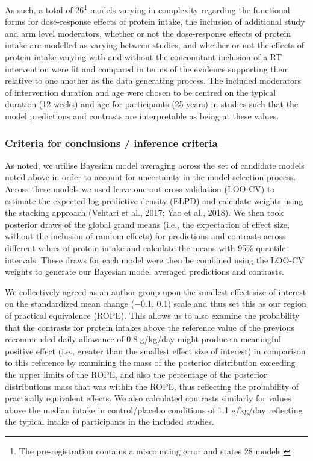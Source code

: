 \documentclass[
]{article}
\begin{document}
As such, a total of 26\footnote{The pre-registration contains a
  miscounting error and states 28 models.} models varying in complexity
regarding the functional forms for dose-response effects of protein
intake, the inclusion of additional study and arm level moderators,
whether or not the dose-response effects of protein intake are modelled
as varying between studies, and whether or not the effects of protein
intake varying with and without the concomitant inclusion of a RT
intervention were fit and compared in terms of the evidence supporting
them relative to one another as the data generating process. The
included moderators of intervention duration and age were chosen to be
centred on the typical duration (12 weeks) and age for participants (25
years) in studies such that the model predictions and contrasts are
interpretable as being at these values.

\subsubsection{Criteria for conclusions / inference
criteria}\label{criteria-for-conclusions-inference-criteria}

As noted, we utilise Bayesian model averaging across the set of
candidate models noted above in order to account for uncertainty in the
model selection process. Across these models we used leave-one-out
cross-validation (LOO-CV) to estimate the expected log predictive
density (ELPD) and calculate weights using the stacking approach
(Vehtari et al., 2017; Yao et al., 2018). We then took posterior draws
of the global grand means (i.e., the expectation of effect size, without
the inclusion of random effects) for predictions and contrasts across
different values of protein intake and calculate the means with 95\%
quantile intervals. These draws for each model were then be combined
using the LOO-CV weights to generate our Bayesian model averaged
predictions and contrasts.

We collectively agreed as an author group upon the smallest effect size
of interest on the standardized mean change (−0.1, 0.1) scale and thus
set this as our region of practical equivalence (ROPE). This allows us
to also examine the probability that the contrasts for protein intakes
above the reference value of the previous recommended daily allowance of
0.8 g/kg/day might produce a meaningful positive effect (i.e., greater
than the smallest effect size of interest) in comparison to this
reference by examining the mass of the posterior distribution exceeding
the upper limits of the ROPE, and also the percentage of the posterior
distributions mass that was within the ROPE, thus reflecting the
probability of practically equivalent effects. We also calculated
contrasts similarly for values above the median intake in
control/placebo conditions of 1.1 g/kg/day reflecting the typical intake
of participants in the included studies.
\end{document}
